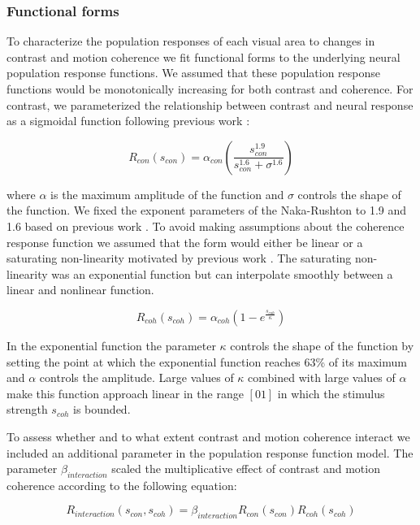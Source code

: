 \subsubsection{Functional forms}

To characterize the population responses of each visual area to changes in contrast and motion coherence we fit functional forms to the underlying neural population response functions. We assumed that these population response functions would be monotonically increasing for both contrast and coherence. For contrast, we parameterized the relationship between contrast and neural response as a sigmoidal function \citep{Naka1966-fh} following previous work \citep{Albrecht1982-rq}:

\begin{equation}
    R_{con}(s_{con})=\alpha_{con}(\frac{s_{con}^{1.9}}{s_{con}^{1.6}+\sigma^{1.6}})
\end{equation}

where $\alpha$ is the maximum amplitude of the function and $\sigma$ controls the shape of the function. We fixed the exponent parameters of the Naka-Rushton to 1.9 and 1.6 based on previous work \citep{Boynton1999-jd}.
To avoid making assumptions about the coherence response function we assumed that the form would either be linear or a saturating non-linearity motivated by previous work \citep{Rees2000-ul,Simoncelli1998-ts}. The saturating non-linearity was an exponential function but can interpolate smoothly between a linear and nonlinear function.

\begin{equation}
R_{coh}(s_{coh})=\alpha_{coh} (1 - e^{\frac{s_{coh}}{\kappa}})
\end{equation}

In the exponential function the parameter $\kappa$ controls the shape of the function by setting the point at which the exponential function reaches 63\% of its maximum and $\alpha$ controls the amplitude. Large values of $\kappa$ combined with large values of $\alpha$ make this function approach linear in the range $[0 1]$ in which the stimulus strength $s_{coh}$ is bounded.

To assess whether and to what extent contrast and motion coherence interact we included an additional parameter in the population response function model. The parameter $\beta_{interaction}$ scaled the multiplicative effect of contrast and motion coherence according to the following equation:

\begin{equation}
    R_{interaction}(s_{con},s_{coh})=\beta_{interaction}R_{con}(s_{con})R_{coh}(s_{coh})
\end{equation}

